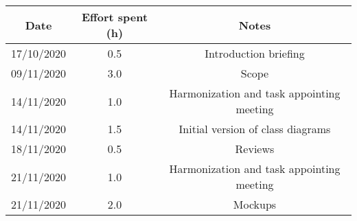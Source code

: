 \documentclass[../../main.tex]{subfiles}
\begin{document}
\begin{center}
    \begin{tabular}{|c| |c| |c|} 
        \hline
        Date & Effort spent (h) & Notes\\ [0.5ex] 
        \hline\hline
        17/10/2020 & 0.5 & Introduction briefing\\ 
        09/11/2020 & 3.0 & Scope\\ 
        14/11/2020 & 1.0 & Harmonization and task appointing meeting\\
        14/11/2020 & 1.5 & Initial version of class diagrams\\
        18/11/2020 & 0.5 & Reviews\\
        21/11/2020 & 1.0 & Harmonization and task appointing meeting\\
        21/11/2020 & 2.0 & Mockups\\
        \hline
    \end{tabular}
\end{center}
\end{document}
